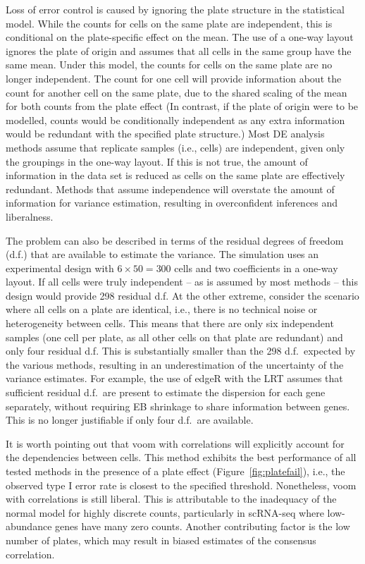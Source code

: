 \documentclass{article}
\begin{document}
Loss of error control is caused by ignoring the plate structure in the statistical model.
While the counts for cells on the same plate are independent, this is conditional on the plate-specific effect on the mean.
The use of a one-way layout ignores the plate of origin and assumes that all cells in the same group have the same mean.
Under this model, the counts for cells on the same plate are no longer independent.
The count for one cell will provide information about the count for another cell on the same plate,
    due to the shared scaling of the mean for both counts from the plate effect
(In contrast, if the plate of origin were to be modelled, counts would be conditionally independent as any extra information would be redundant with the specified plate structure.)
Most DE analysis methods assume that replicate samples (i.e., cells) are independent, given only the groupings in the one-way layout.
If this is not true, the amount of information in the data set is reduced as cells on the same plate are effectively redundant.
Methods that assume independence will overstate the amount of information for variance estimation, resulting in overconfident inferences and liberalness.

The problem can also be described in terms of the residual degrees of freedom (d.f.) that are available to estimate the variance.
The simulation uses an experimental design with $6 \times 50 =  300$ cells and two coefficients in a one-way layout.
If all cells were truly independent -- as is assumed by most methods -- this design would provide 298 residual d.f. 
At the other extreme, consider the scenario where all cells on a plate are identical, i.e., there is no technical noise or heterogeneity between cells.
This means that there are only six independent samples (one cell per plate, as all other cells on that plate are redundant) and only four residual d.f.
This is substantially smaller than the 298 d.f.\ expected by the various methods, resulting in an underestimation of the uncertainty of the variance estimates.
For example, the use of edgeR with the LRT assumes that sufficient residual d.f.\ are present to estimate the dispersion for each gene separately,
    without requiring EB shrinkage to share information between genes.
This is no longer justifiable if only four d.f.\ are available.

It is worth pointing out that voom with correlations will explicitly account for the dependencies between cells.
This method exhibits the best performance of all tested methods in the presence of a plate effect (Figure~\ref{fig:platefail}),
    i.e., the observed type I error rate is closest to the specified threshold.
Nonetheless, voom with correlations is still liberal.
This is attributable to the inadequacy of the normal model for highly discrete counts, particularly in scRNA-seq where low-abundance genes have many zero counts.
Another contributing factor is the low number of plates, which may result in biased estimates of the consensus correlation.
\end{document}
